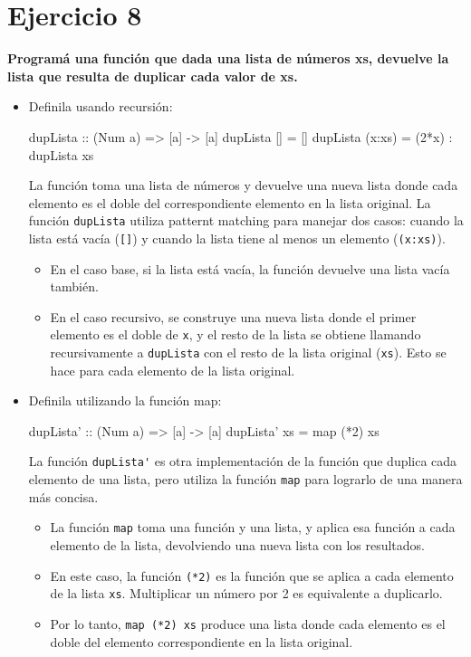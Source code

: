 \documentclass{article}
\begin{document}
\section*{Ejercicio 8}
\textbf{Programá una función que dada una lista de números xs, devuelve la lista que resulta de duplicar cada valor de xs.}
\begin{itemize}

    \item Definila usando recursión:
\begin{haskell}
dupLista :: (Num a) => [a] -> [a]
dupLista [] = []
dupLista (x:xs) = (2*x) : dupLista xs
\end{haskell}
    La función toma una lista de números y devuelve una nueva lista donde cada elemento es el doble del correspondiente elemento en la lista original.
    La función \verb|dupLista| utiliza patternt matching para manejar dos casos: cuando la lista está vacía (\verb|[]|) y cuando la lista tiene al menos un elemento (\verb|(x:xs)|).
    \begin{itemize}
    \item 
    En el caso base, si la lista está vacía, la función devuelve una lista vacía también.
    \item 
    En el caso recursivo, se construye una nueva lista donde el primer elemento es el doble de \verb|x|, y el resto de la lista se obtiene llamando recursivamente a \verb|dupLista| con el resto de la lista original (\verb|xs|). Esto se hace para cada elemento de la lista original.
    \end{itemize}
    
    \item Definila utilizando la función map:
\begin{haskell}
dupLista' :: (Num a) => [a] -> [a]
dupLista' xs = map (*2) xs
\end{haskell}        
La función \verb|dupLista'| es otra implementación de la función que duplica cada elemento de una lista, pero utiliza la función \verb|map| para lograrlo de una manera más concisa.
\begin{itemize}
\item 
La función \verb|map| toma una función y una lista, y aplica esa función a cada elemento de la lista, devolviendo una nueva lista con los resultados.
\item 
En este caso, la función \verb|(*2)| es la función que se aplica a cada elemento de la lista \verb|xs|. Multiplicar un número por 2 es equivalente a duplicarlo.
\item 
Por lo tanto, \verb|map (*2) xs| produce una lista donde cada elemento es el doble del elemento correspondiente en la lista original.
\end{itemize}
\end{itemize}
\end{document}
